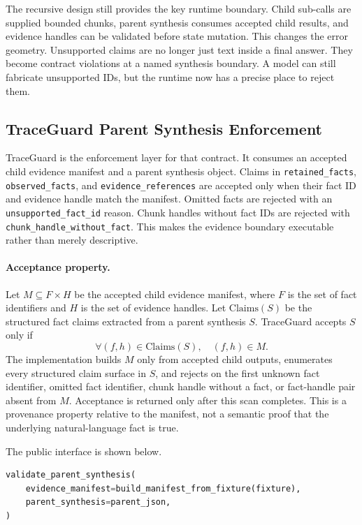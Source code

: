 \documentclass[11pt,a4paper]{article}
\begin{document}
The recursive design still provides the key runtime boundary. Child sub-calls
are supplied bounded chunks, parent synthesis consumes accepted child results,
and evidence handles can be validated before state mutation.
This changes the error geometry. Unsupported claims are no longer just text
inside a final answer. They become contract violations at a named synthesis
boundary. A model can still fabricate unsupported IDs, but the runtime now
has a precise place to reject them.

\subsection{TraceGuard Parent Synthesis Enforcement}

TraceGuard is the enforcement layer for that contract. It consumes an
accepted child evidence manifest and a parent synthesis object. Claims in
\texttt{retained\_facts}, \texttt{observed\_facts}, and
\texttt{evidence\_references} are accepted only when their fact ID and
evidence handle match the manifest. Omitted facts are rejected with an
\texttt{unsupported\_fact\_id} reason. Chunk handles without fact IDs are
rejected with \texttt{chunk\_handle\_without\_fact}. This makes the
evidence boundary executable rather than merely descriptive.

\paragraph{Acceptance property.}
Let $M \subseteq F \times H$ be the accepted child evidence manifest, where
$F$ is the set of fact identifiers and $H$ is the set of evidence handles.
Let $\mathrm{Claims}(S)$ be the structured fact claims extracted from a
parent synthesis $S$. TraceGuard accepts $S$ only if
\[
  \forall (f,h) \in \mathrm{Claims}(S), \quad (f,h) \in M.
\]
The implementation builds $M$ only from accepted child outputs, enumerates
every structured claim surface in $S$, and rejects on the first unknown fact
identifier, omitted fact identifier, chunk handle without a fact, or
fact-handle pair absent from $M$. Acceptance is returned only after this scan
completes. This is a provenance property relative to the manifest, not a
semantic proof that the underlying natural-language fact is true.

The public interface is shown below.

\begin{lstlisting}[language=Python]
validate_parent_synthesis(
    evidence_manifest=build_manifest_from_fixture(fixture),
    parent_synthesis=parent_json,
)
\end{lstlisting}
\end{document}
